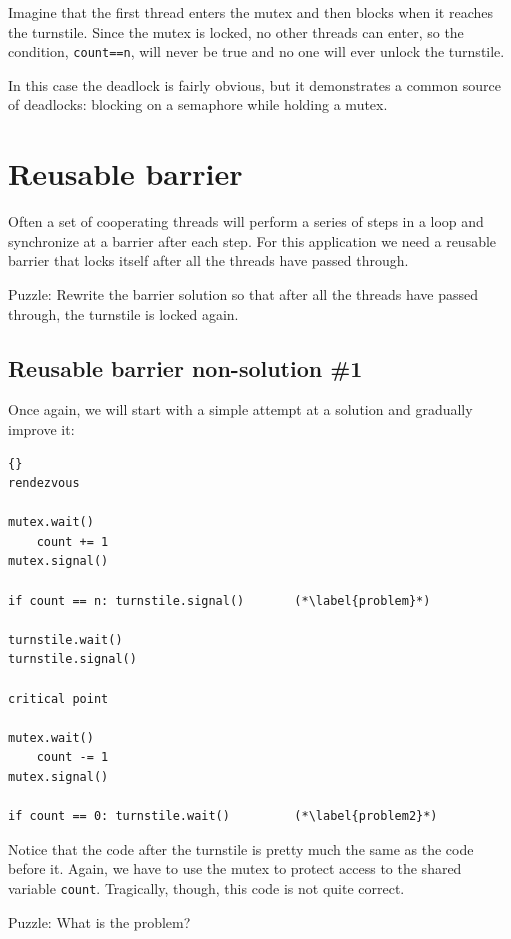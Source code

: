 \documentclass{book}
\newcommand{\clearemptydoublepage}{\newpage\cleardoublepage}
\begin{document}
Imagine that the first thread enters the
mutex and then blocks when it reaches the turnstile.
Since the mutex is locked, no other threads can enter,
so the condition, {\tt count==n}, will never be true and
no one will ever unlock the turnstile.

In this case the deadlock is fairly obvious, but it
demonstrates a
common source of deadlocks: blocking on a semaphore while
holding a mutex.


\section {Reusable barrier}
\label{rebar}

Often a set of cooperating threads will perform a series of steps
in a loop and synchronize at a barrier after each step.  For this
application we need a reusable barrier that locks itself after
all the threads have passed through.

Puzzle: Rewrite the barrier solution so that after all the threads
have passed through, the turnstile is locked again.


\clearemptydoublepage
\subsection {Reusable barrier non-solution \#1}

Once again, we will start with a simple attempt at a solution
and gradually improve it:

\begin{lstlisting}[title={Reusable barrier non-solution}]{}
rendezvous

mutex.wait()
    count += 1
mutex.signal()

if count == n: turnstile.signal()       (*\label{problem}*)

turnstile.wait()
turnstile.signal()

critical point

mutex.wait()
    count -= 1
mutex.signal()

if count == 0: turnstile.wait()         (*\label{problem2}*)
\end{lstlisting}

Notice that the code after the turnstile is pretty much the same as
the code before it.  Again, we have to use the mutex to protect access
to the shared variable {\tt count}.
Tragically, though, this code is not quite correct.

Puzzle: What is the problem?


\clearemptydoublepage
\end{document}
